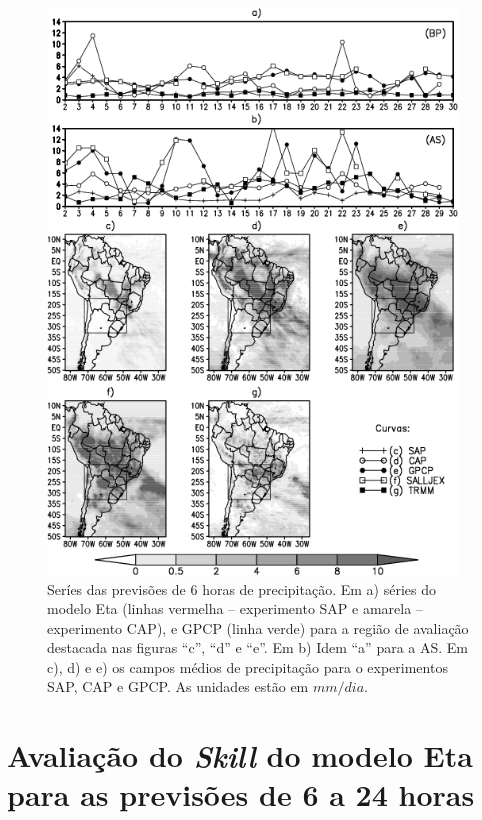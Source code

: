 \begin{figure}[!hbp]
\centering
\includegraphics[height=15cm]{./figs/serie_precipitacao-FCT06h.png}
\caption{Seríes das previsões de 6 horas de precipitação. Em a) séries do modelo Eta (linhas vermelha – experimento SAP e amarela – experimento CAP), e GPCP (linha verde) para a região de avaliação destacada nas figuras ``c'', ``d'' e ``e''. Em b) Idem ``a'' para a AS. Em c), d) e e) os campos médios de precipitação para o experimentos SAP, CAP e GPCP. As unidades estão em $mm/dia$.}
\label{fig52}
\end{figure}

\section{Avaliação do \textit{Skill} do modelo Eta para as previsões de 6 a 24 horas}
\label{ss:avalskill}

